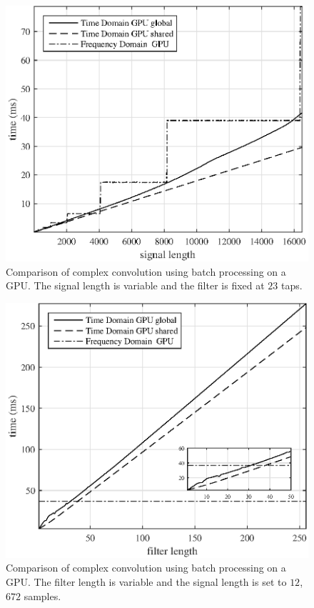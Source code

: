\begin{figure}
	\centering\includegraphics[width=5in]{figures/gpu_intro/CPUvsGPU_3104batch_23taps_varySignal.eps}
	\caption{Comparison of complex convolution using batch processing on a GPU. The signal length is variable and the filter is fixed at $23$ taps.}
	\label{fig:CPUvsGPU_3104batch_23taps_varySignal}
\end{figure}
\begin{figure}
	\centering\includegraphics[width=5in]{figures/gpu_intro/CPUvsGPU_3104batch_12672signal_varyFilter.eps}
	\caption{Comparison of complex convolution using batch processing on a GPU. The filter length is variable and the signal length is set to $12$,$672$ samples.}
	\label{fig:CPUvsGPU_3104batch_12672signal_varyFilter}
\end{figure}
